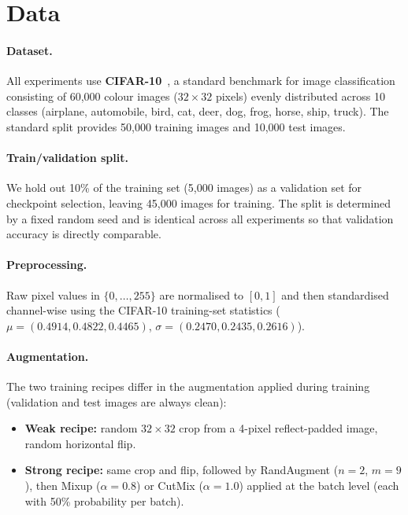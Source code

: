 \section{Data}
\label{sec:data}

\paragraph{Dataset.}
All experiments use \textbf{CIFAR-10}~\cite{krizhevsky2009cifar}, a standard benchmark for image classification consisting of 60{,}000 colour images ($32\times32$ pixels) evenly distributed across 10 classes (airplane, automobile, bird, cat, deer, dog, frog, horse, ship, truck).
The standard split provides 50{,}000 training images and 10{,}000 test images.

\paragraph{Train/validation split.}
We hold out 10\% of the training set (5{,}000 images) as a validation set for checkpoint selection, leaving 45{,}000 images for training.
The split is determined by a fixed random seed and is identical across all experiments so that validation accuracy is directly comparable.

\paragraph{Preprocessing.}
Raw pixel values in $\{0,\ldots,255\}$ are normalised to $[0,1]$ and then standardised channel-wise using the CIFAR-10 training-set statistics ($\mu = (0.4914, 0.4822, 0.4465)$, $\sigma = (0.2470, 0.2435, 0.2616)$).

\paragraph{Augmentation.}
The two training recipes differ in the augmentation applied during training (validation and test images are always clean):

\begin{itemize}[leftmargin=*,topsep=2pt,itemsep=1pt]
    \item \textbf{Weak recipe:} random $32\times32$ crop from a 4-pixel reflect-padded image, random horizontal flip.
    \item \textbf{Strong recipe:} same crop and flip, followed by RandAugment ($n{=}2$, $m{=}9$), then Mixup ($\alpha{=}0.8$) or CutMix ($\alpha{=}1.0$) applied at the batch level (each with 50\% probability per batch).
\end{itemize}

